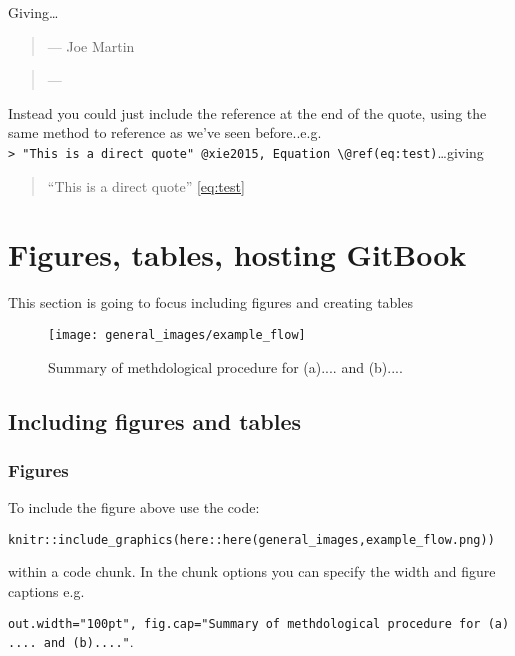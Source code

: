 \documentclass[
  12pt,
  oneside]{book}
\begin{document}
Giving\ldots{}

\begin{quote}
\hfill --- Joe Martin
\end{quote}

\begin{quote}
\hfill --- \textcite{xie2015}
\end{quote}

Instead you could just include the reference at the end of the quote, using the same method to reference as we've seen before..e.g. \texttt{\textgreater{}\ "This\ is\ a\ direct\ quote"\ @xie2015,\ Equation\ \textbackslash{}@ref(eq:test)}\ldots giving

\begin{quote}
``This is a direct quote'' \textcite{xie2015} \eqref{eq:test}
\end{quote}

\chapter{Figures, tables, hosting GitBook}\label{figures-tables-hosting-gitbook}

This section is going to focus including figures and creating tables

\begin{figure}
\texttt{[image: general\_images/example\_flow]} \caption{Summary of methdological procedure for (a).... and (b)....}\label{fig:methodsflow}
\end{figure}

\section{Including figures and tables}\label{including-figures-and-tables}

\subsection{Figures}\label{figures}

To include the figure above use the code:

\texttt{knitr::include\_graphics(here::here(\textquotesingle{}general\_images\textquotesingle{},\textquotesingle{}example\_flow.png\textquotesingle{}))}

within a code chunk. In the chunk options you can specify the width and figure captions e.g.~

\texttt{out.width="100pt",\ fig.cap="Summary\ of\ methdological\ procedure\ for\ (a)....\ and\ (b)...."}.
\end{document}
